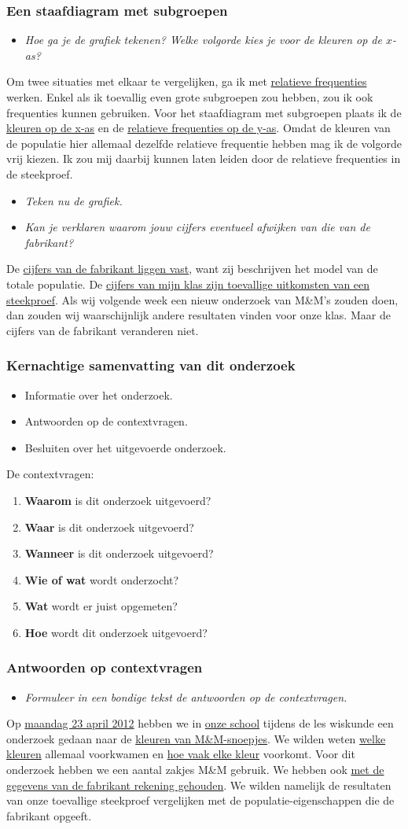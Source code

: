 \documentclass[dutch]{beamer}
\newcommand{\vraag}[1]{\begin{itemize}\item {\it #1}\end{itemize}}
\begin{document}
\begin{frame}
\frametitle{Een staafdiagram met subgroepen}
\vraag{Hoe ga je de grafiek tekenen? Welke volgorde kies je voor de kleuren op de $x$-as?}
\pause
Om twee situaties met elkaar te vergelijken, ga ik met \uline{relatieve frequenties} werken. Enkel als
ik toevallig even grote subgroepen zou hebben, zou ik ook frequenties kunnen gebruiken.
Voor het staafdiagram met subgroepen plaats ik de \uline{kleuren op de x-as} en de \uline{relatieve
frequenties op de y-as}. Omdat de kleuren van de populatie hier allemaal dezelfde relatieve
frequentie hebben mag ik de volgorde vrij kiezen. Ik zou mij daarbij kunnen laten leiden door
de relatieve frequenties in de steekproef.
\pause
\vraag{Teken nu de grafiek.}
\pause
\vraag{Kan je verklaren waarom jouw cijfers eventueel afwijken van die van de fabrikant?}
\pause
De \uline{cijfers van de fabrikant liggen vast}, want zij beschrijven het model van de totale
populatie. De \uline{cijfers van mijn klas zijn toevallige uitkomsten van een steekproef}. Als wij
volgende week een nieuw onderzoek van M\&M’s zouden doen, dan zouden wij waarschijnlijk
andere resultaten vinden voor onze klas. Maar de cijfers van de fabrikant veranderen niet.
\end{frame}

\begin{frame}
\frametitle{Kernachtige samenvatting van dit onderzoek}
\begin{itemize}
  \item Informatie over het onderzoek.
  \item Antwoorden op de contextvragen.
  \item Besluiten over het uitgevoerde onderzoek.
\end{itemize}
\pause
De contextvragen:
\begin{enumerate}
  \item {\bf Waarom} is dit onderzoek uitgevoerd?
  \item {\bf Waar} is dit onderzoek uitgevoerd?
  \item {\bf Wanneer} is dit onderzoek uitgevoerd?
  \item {\bf Wie of wat} wordt onderzocht?
  \item {\bf Wat} wordt er juist opgemeten?
  \item {\bf Hoe} wordt dit onderzoek uitgevoerd?
\end{enumerate}
\end{frame}

\begin{frame}
\frametitle{Antwoorden op contextvragen}
\vraag{Formuleer in een bondige tekst de antwoorden op de contextvragen.}
\pause
Op \uline{maandag 23 april 2012} hebben we in \uline{onze school} tijdens de les wiskunde een
onderzoek gedaan naar de \uline{kleuren van M\&M-snoepjes}. We wilden weten \uline{welke kleuren}
allemaal voorkwamen en \uline{hoe vaak elke kleur} voorkomt. Voor dit onderzoek hebben we een
aantal zakjes M\&M gebruik. We hebben ook \uline{met de gegevens van de fabrikant rekening gehouden}.
We wilden namelijk de resultaten van onze toevallige steekproef vergelijken met de
populatie-eigenschappen die de fabrikant opgeeft.
\end{frame}
\end{document}
